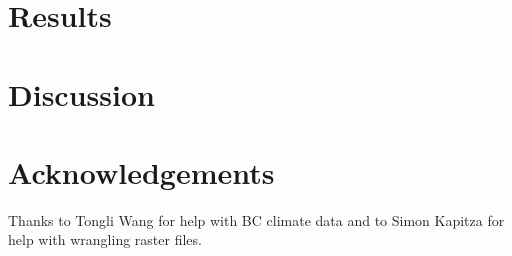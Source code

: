\documentclass[11pt,twoside,lineno]{GSA_format}
\begin{document}
\section{Results}

\section{Discussion}


\section{Acknowledgements}

Thanks to Tongli Wang for help with BC climate data and to Simon Kapitza for help with wrangling raster files. 



%
\end{document}

